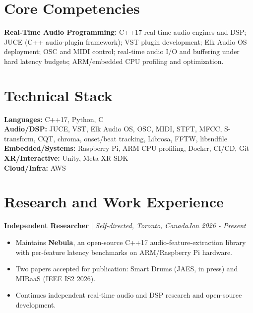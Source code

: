 \documentclass[11pt]{article}
\newenvironment{cvrole}[5]{%
  \par\noindent\textbf{\large #1} | \textit{\small #2, #3}\hfill \textit{\small #4 - #5}\par
  \begin{itemize}[leftmargin=2em, itemsep=-0.3em, topsep=-0.5em]%
}{%
  \end{itemize}\par\noindent\mbox{}\par\vspace{0.1em}%
}
\begin{document}
\section*{Core Competencies}
\textbf{Real-Time Audio Programming:} C++17 real-time audio engines and DSP; JUCE (C++ audio-plugin framework); VST plugin development; Elk Audio OS deployment; OSC and MIDI control; real-time audio I/O and buffering under hard latency budgets; ARM/embedded CPU profiling and optimization.

\section*{Technical Stack}
\textbf{Languages:} C++17, Python, C \\
\textbf{Audio/DSP:} JUCE, VST, Elk Audio OS, OSC, MIDI, STFT, MFCC, S-transform, CQT, chroma, onset/beat tracking, Librosa, FFTW, libsndfile \\
\textbf{Embedded/Systems:} Raspberry Pi, ARM CPU profiling, Docker, CI/CD, Git \\
\textbf{XR/Interactive:} Unity, Meta XR SDK \\
\textbf{Cloud/Infra:} AWS

\section*{Research and Work Experience}

\begin{cvrole}{Independent Researcher}{Self-directed}{Toronto, Canada}{Jan 2026}{Present}
\item Maintains \textbf{Nebula}, an open-source C++17 audio-feature-extraction library with per-feature latency benchmarks on ARM/Raspberry Pi hardware.
\item Two papers accepted for publication: Smart Drums (JAES, in press) and MIRaaS (IEEE IS2 2026).
\item Continues independent real-time audio and DSP research and open-source development.
\end{cvrole}
\end{document}

